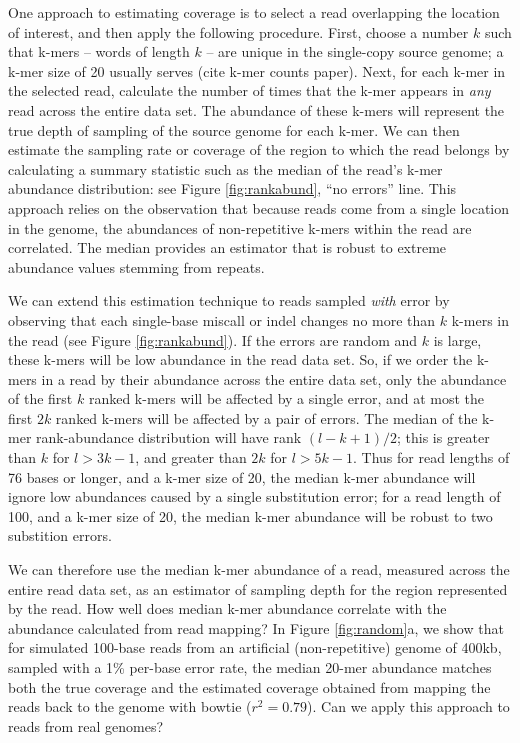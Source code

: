 \documentclass[10pt]{article}
\begin{document}
One approach to estimating coverage is to select a read overlapping
the location of interest, and then apply the following
procedure. First, choose a number $k$ such that k-mers -- words of
length $k$ -- are unique in the single-copy source genome; a k-mer
size of 20 usually serves (cite k-mer counts paper).  Next, for each
k-mer in the selected read, calculate the number of times that the
k-mer appears in {\em any} read across the entire data set.  The
abundance of these k-mers will represent the true depth of sampling of
the source genome for each k-mer.  We can then estimate the sampling
rate or coverage of the region to which the read belongs by
calculating a summary statistic such as the median of the
read's k-mer abundance distribution: see Figure \ref{fig:rankabund},
``no errors'' line. This approach relies on the observation that
because reads come from a single location in the genome, the
abundances of non-repetitive k-mers within the read are correlated.
The median provides an estimator that is robust to extreme abundance
values stemming from repeats.

We can extend this estimation technique to reads sampled {\em with}
error by observing that each single-base miscall or indel changes no
more than $k$ k-mers in the read (see Figure \ref{fig:rankabund}).  If
the errors are random and $k$ is large, these k-mers will be low
abundance in the read data set.  So, if we order the k-mers in a read
by their abundance across the entire data set, only the abundance of
the first $k$ ranked k-mers will be affected by a single error, and at
most the first $2k$ ranked k-mers will be affected by a pair of
errors.  The median of the k-mer rank-abundance distribution will have
rank $(l - k + 1) / 2$; this is greater than $k$ for $l > 3k-1$, and
greater than $2k$ for $l > 5k-1$.  Thus for read lengths of 76 bases
or longer, and a k-mer size of 20, the median k-mer abundance will
ignore low abundances caused by a single substitution error; for a read
length of 100, and a k-mer size of 20, the median k-mer abundance will
be robust to two substition errors.

We can therefore use the median k-mer abundance of a read, measured
across the entire read data set, as an estimator of sampling depth for
the region represented by the read. How well does median k-mer
abundance correlate with the abundance calculated from read mapping?
In Figure \ref{fig:random}a, we show that for simulated 100-base reads
from an artificial (non-repetitive) genome of 400kb, sampled with a
1\% per-base error rate, the median 20-mer abundance matches both the
true coverage and the estimated coverage obtained from mapping the
reads back to the genome with bowtie ($r^2 = 0.79$).  Can we apply
this approach to reads from real genomes?
\end{document}
